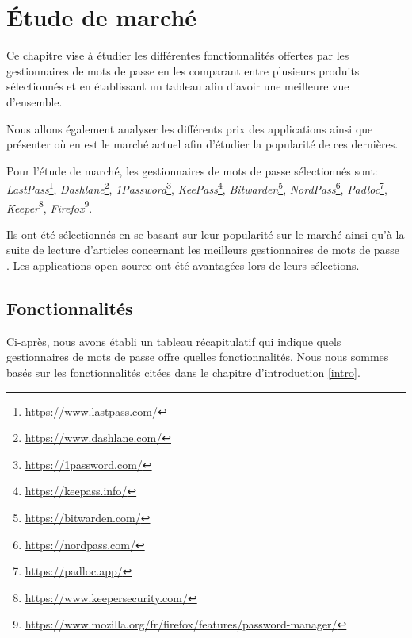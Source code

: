 


\chapter{Étude de marché}
\label{ch:etude_marche}
Ce chapitre vise à étudier les différentes fonctionnalités offertes par les gestionnaires de mots de passe en les comparant entre plusieurs produits sélectionnés et en établissant un tableau afin d'avoir une meilleure vue d'ensemble.

Nous allons également analyser les différents prix des applications ainsi que présenter où en est le marché actuel afin d'étudier la popularité de ces dernières.

Pour l'étude de marché, les gestionnaires de mots de passe sélectionnés sont: \textit{LastPass}\footnote{\href{https://www.lastpass.com/}{https://www.lastpass.com/}}, \textit{Dashlane}\footnote{\href{https://www.dashlane.com/}{https://www.dashlane.com/}}, \textit{1Password}\footnote{\href{https://1password.com/}{https://1password.com/}}, \textit{KeePass}\footnote{\href{https://keepass.info/}{https://keepass.info/}}, \textit{Bitwarden}\footnote{\href{https://bitwarden.com/}{https://bitwarden.com/}}, \textit{NordPass}\footnote{\href{https://nordpass.com/}{https://nordpass.com/}}, \textit{Padloc}\footnote{\href{https://padloc.app/}{https://padloc.app/}}, \textit{Keeper}\footnote{\href{https://www.keepersecurity.com/}{https://www.keepersecurity.com/}}, \textit{Firefox}\footnote{\href{https://www.mozilla.org/fr/firefox/features/password-manager/}{https://www.mozilla.org/fr/firefox/features/password-manager/}}.

Ils ont été sélectionnés en se basant sur leur popularité sur le marché ainsi qu'à la suite de lecture d'articles concernant les meilleurs gestionnaires de mots de passe \cite{BPM22}\cite{gallagher19}\cite{MSPM22}\cite{PM22}. Les applications open-source ont été avantagées lors de leurs sélections.
\section{Fonctionnalités}
Ci-après, nous avons établi un tableau récapitulatif qui indique quels gestionnaires de mots de passe offre quelles fonctionnalités. Nous nous sommes basés sur les fonctionnalités citées dans le chapitre d'introduction \ref{intro}.

